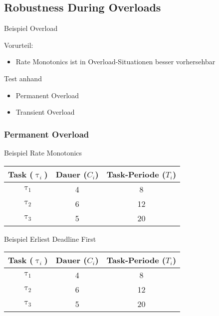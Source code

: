 \subsection{Robustness During Overloads}

\begin{frame}{\subsecname}
	Beispiel Overload
\end{frame}

\begin{frame}{\subsecname}
	Vorurteil:
	\begin{itemize}
		\item Rate Monotonics ist in Overload-Situationen besser vorhersehbar
	\end{itemize}$ $\\\pause
	Test anhand
	\begin{itemize}
		\item Permanent Overload
		\item Transient Overload
	\end{itemize}
\end{frame}

\subsubsection{Permanent Overload}
\begin{frame}{Beispiel Rate Monotonics}
	\begin{center}
		\begin{tabular}{c||c|c}
			Task ($\uptau_i$) & Dauer ($C_i$) & Task-Periode ($T_i$)\\\hline\hline
			$\uptau_1$ & 4 & 8\\
			$\uptau_2$ & 6 & 12\\
			$\uptau_3$ & 5 & 20
		\end{tabular}
	\end{center}
	
\end{frame}

\begin{frame}{Beispiel Erliest Deadline First}
	\begin{center}
		\begin{tabular}{c||c|c}
			Task ($\uptau_i$) & Dauer ($C_i$) & Task-Periode ($T_i$)\\\hline\hline
			$\uptau_1$ & 4 & 8\\
			$\uptau_2$ & 6 & 12\\
			$\uptau_3$ & 5 & 20
		\end{tabular}
	\end{center}
	
\end{frame}

